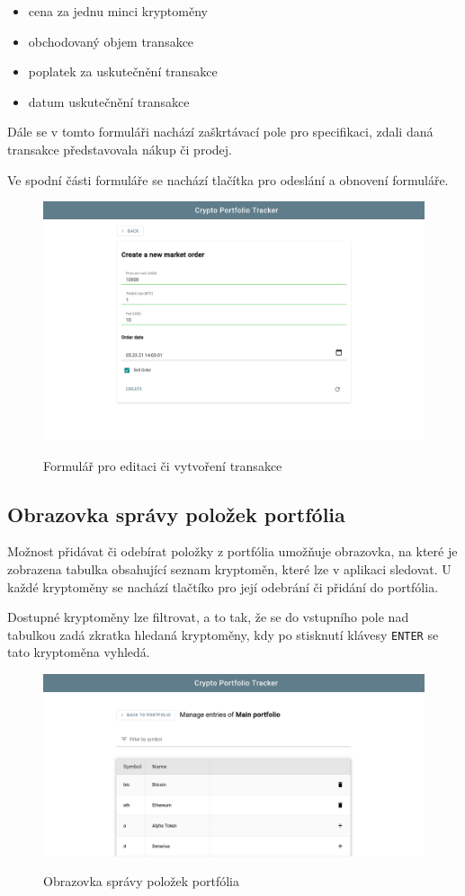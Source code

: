 \documentclass[12pt, a4paper]{article}
\begin{document}
    \begin{itemize}
        \item cena za jednu minci kryptoměny
        \item obchodovaný objem transakce
        \item poplatek za uskutečnění transakce
        \item datum uskutečnění transakce
    \end{itemize}
    Dále se v tomto formuláři nachází zaškrtávací pole pro specifikaci, zdali daná transakce představovala nákup či prodej.
    
    Ve spodní části formuláře se nachází tlačítka pro odeslání a obnovení formuláře.

    \begin{figure}[!ht]
        \centering
        {\includegraphics[width=\textwidth]{img/cpt-screenshots/order-form.png}}
        \caption{Formulář pro editaci či vytvoření transakce}
        \label{fig:transaction-form}
    \end{figure}

    \subsection{Obrazovka správy položek portfólia}
    Možnost přidávat či odebírat položky z portfólia umožňuje obrazovka, na které je zobrazena tabulka obsahující seznam
    kryptoměn, které lze v aplikaci sledovat.
    U každé kryptoměny se nachází tlačtíko pro její odebrání či přidání do portfólia.
    
    Dostupné kryptoměny lze filtrovat, a to tak, že se do vstupního pole nad tabulkou zadá zkratka hledaná kryptoměny, kdy po stisknutí klávesy \texttt{ENTER} se tato kryptoměna vyhledá.

    \begin{figure}[!ht]
        \centering
        {\includegraphics[width=\textwidth]{img/cpt-screenshots/portfolio-entry-mngmt.png}}
        \caption{Obrazovka správy položek portfólia}
        \label{fig:portfolio-entry-mngmnt}
    \end{figure}

    \printbibliography
\end{document}
